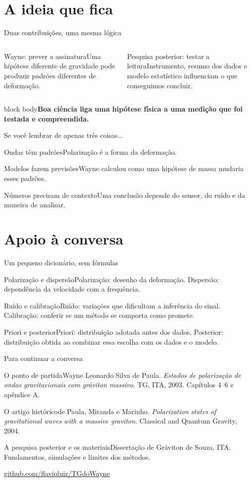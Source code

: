 \documentclass[aspectratio=169,11pt]{beamer}
\newcommand{\key}[1]{\par\vspace{3mm}\begin{beamercolorbox}[sep=3mm,wd=\linewidth]{block body}\textbf{#1}\end{beamercolorbox}}
\newcommand{\card}[2]{\begin{block}{#1}#2\end{block}}
\begin{document}
\section{A ideia que fica}
\begin{frame}{Duas contribuições, uma mesma lógica}
\begin{columns}[T]\card{Wayne: prever a assinatura}{Uma hipótese diferente de gravidade pode produzir padrões diferentes de deformação.}\card{Pesquisa posterior: testar a leitura}{Instrumento, resumo dos dados e modelo estatístico influenciam o que conseguimos concluir.}\end{columns}\key{Boa ciência liga uma hipótese física a uma medição que foi testada e compreendida.}
\end{frame}
\begin{frame}{Se você lembrar de apenas três coisas...}
\card{Ondas têm padrões}{Polarização é a forma da deformação.}\card{Modelos fazem previsões}{Wayne calculou como uma hipótese de massa mudaria esses padrões.}\card{Números precisam de contexto}{Uma conclusão depende do sensor, do ruído e da maneira de analisar.}
\end{frame}
\appendix
\section{Apoio à conversa}
\begin{frame}{Um pequeno dicionário, sem fórmulas}
\small
\card{Polarização e dispersão}{Polarização: desenho da deformação. Dispersão: dependência da velocidade com a frequência.}
\card{Ruído e calibração}{Ruído: variações que dificultam a inferência do sinal. Calibração: conferir se um método se comporta como promete.}
\card{Priori e posterior}{Priori: distribuição adotada antes dos dados. Posterior: distribuição obtida ao combinar essa escolha com os dados e o modelo.}
\end{frame}
\begin{frame}{Para continuar a conversa}
\card{O ponto de partida}{Wayne Leonardo Silva de Paula. \emph{Estados de polarização de ondas gravitacionais com gráviton massivo}. TG, ITA, 2003. Capítulos 4--6 e apêndice A.}
\card{O artigo histórico}{de Paula, Miranda e Marinho. \emph{Polarization states of gravitational waves with a massive graviton}. Classical and Quantum Gravity, 2004.}
\card{A pesquisa posterior e os materiais}{Dissertação de Gráviton de Souza, ITA. Fundamentos, simulações e limites dos métodos.\par\href{https://github.com/flavioluiz/TGdoWayne}{github.com/flavioluiz/TGdoWayne}}
\end{frame}
\end{document}
